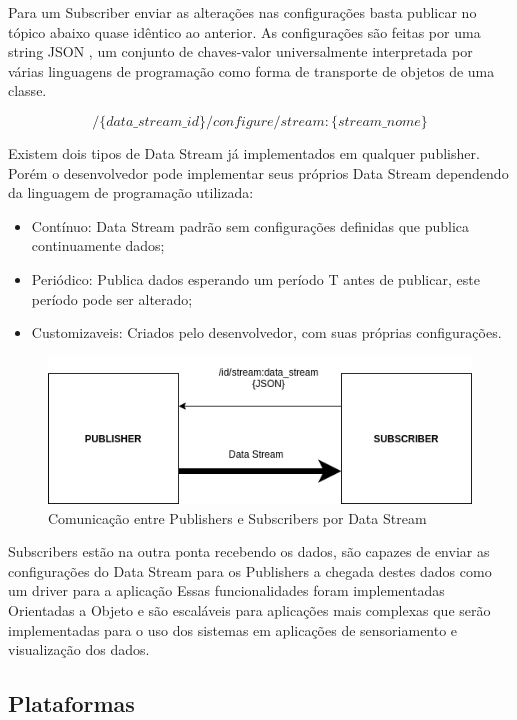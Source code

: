 Para um Subscriber enviar as alterações nas configurações basta publicar no tópico abaixo quase idêntico ao anterior. As configurações são feitas por uma string JSON \cite{json}, um conjunto de chaves-valor universalmente interpretada por várias linguagens de programação como forma de transporte de objetos de uma classe.

$$ /\{data\_stream\_id\}/configure/stream:\{stream\_nome\} $$

Existem dois tipos de Data Stream já implementados em qualquer publisher. Porém o desenvolvedor pode implementar seus próprios Data Stream dependendo da linguagem de programação utilizada:

\begin{itemize}
\item Contínuo: Data Stream padrão sem configurações definidas que publica continuamente dados;
\item Periódico: Publica dados esperando um período T antes de publicar, este período pode ser alterado;
\item Customizaveis: Criados pelo desenvolvedor, com suas próprias configurações.
\end{itemize}




\begin{figure}[h!]
\centering
\includegraphics[width=12cm]{./02_Capitulos/02_Cap3/figures/publisher-subscriber_comm}
\caption{Comunicação entre Publishers e Subscribers por Data Stream}
\label{fig:3.2.0/pub_sub}
\end{figure}

Subscribers estão na outra ponta recebendo os dados, são capazes de enviar as configurações do Data Stream para os Publishers a chegada destes dados como um driver para a aplicação
Essas funcionalidades foram implementadas Orientadas a Objeto e são escaláveis para aplicações mais complexas que serão implementadas para o uso dos sistemas em aplicações de sensoriamento e visualização dos dados.

\subsection{Plataformas}
\label{subsection:plataformas}

